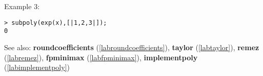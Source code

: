 \noindent Example 3: 
\begin{center}\begin{minipage}{15cm}\begin{Verbatim}[frame=single]
> subpoly(exp(x),[|1,2,3|]);
0
\end{Verbatim}
\end{minipage}\end{center}
See also: \textbf{roundcoefficients} (\ref{labroundcoefficients}), \textbf{taylor} (\ref{labtaylor}), \textbf{remez} (\ref{labremez}), \textbf{fpminimax} (\ref{labfpminimax}), \textbf{implementpoly} (\ref{labimplementpoly})
